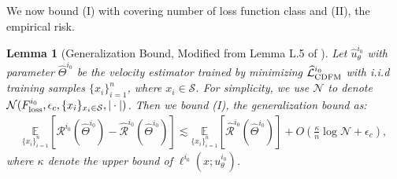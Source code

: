 \documentclass[12pt]{article}
\numberwithin{equation}{section}
\let\hat\widehat
\newcommand{\wh}{\widehat}
\renewcommand{\hat}{\wh}
\DeclareMathOperator*{\E}{{\mathbb{E}}}
\def\E{\mathbb{E}}
\let\cite\citep
\theoremstyle{theoremstyle}
\newtheorem{lemma}{Lemma}[section]
\numberwithin{equation}{section}
\numberwithin{theorem}{section}
\numberwithin{proposition}{section}
\numberwithin{definition}{section}
\numberwithin{lemma}{section}
\numberwithin{assumption}{section}
\numberwithin{remark}{section}
\begin{document}
We now bound (I) with covering number of loss function class and (II), the empirical risk.

\begin{lemma}[Generalization Bound, Modified from Lemma L.5 of \cite{su2025high}]\label{lem:generalization_bound_general_mixture_path}
Let $\hat{u}^{i_0}_\theta$ with parameter $\hat{\Theta}^{i_0}$ be the velocity estimator trained by minimizing $\hat{\mathcal{L}}^{i_0}_{\rm CDFM}$ with i.i.d training samples $\{x_i\}_{i=1}^n$, where $x_i\in \mathcal{S}$.
For simplicity, we use $\mathcal{N}$ to denote $\mathcal{N}(F^{i_0}_{\rm loss},\epsilon_c,\{x_i\}_{x_i\in \mathcal{S}},|\cdot|)$.
Then we bound (I), the generalization bound as:
\begin{align*}
    \underset{\{x_i\}_{i=1}^n}{\E}[\mathcal{R}^{i_0}(\hat{\Theta}^{i_0}) -\hat{\mathcal{R}}^{i_0}(\hat{\Theta}^{i_0})] 
    \lesssim 
    \underset{\{x_i\}_{i=1}^n}{\E}[\hat{\mathcal{R}}^{i_0}(\hat{\Theta}^{i_0})] + O(\frac{\kappa}{n} 
    \log \mathcal{N} + \epsilon_c),
\end{align*}
where $\kappa$ denote the upper bound of $\ell^{i_0}(x;u^{i_0}_\theta)$.
\end{lemma}
\end{document}
